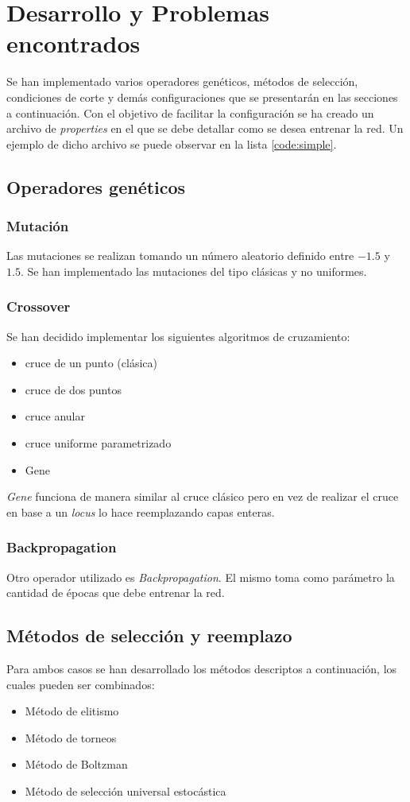 \documentclass{sig-alternate}
\begin{document}
\section{Desarrollo y Problemas encontrados}
Se han implementado varios operadores genéticos, métodos de selección, condiciones de corte y demás configuraciones que se presentarán en las secciones a continuación.
Con el objetivo de facilitar la configuración se ha creado un archivo de
\textit{properties} en el que se debe detallar como se desea entrenar la red.
Un ejemplo de dicho archivo se puede observar en la lista \ref{code:simple}.

	\subsection{Operadores genéticos}
	\subsubsection{Mutación}
	Las mutaciones se realizan tomando un número aleatorio definido entre $-1.5$ y $1.5$.
	Se han implementado las mutaciones del tipo clásicas y no uniformes.

	\subsubsection{Crossover}
	Se han decidido implementar los siguientes algoritmos de cruzamiento:
	\begin{itemize}
		\item cruce de un punto (clásica)
		\item cruce de dos puntos
		\item cruce anular
		\item cruce uniforme parametrizado
		\item Gene
	\end{itemize}

	\textit{Gene} funciona de manera similar al cruce clásico pero en vez de
	realizar el cruce en base a un \textit{locus} lo hace reemplazando
	capas enteras.

	\subsubsection{Backpropagation}
	Otro operador utilizado es \textit{Backpropagation}.
	El mismo toma como parámetro la cantidad de épocas que debe entrenar la red.

	\subsection{Métodos de selección y reemplazo}
	Para ambos casos se han desarrollado los métodos descriptos a
	continuación, los cuales pueden ser combinados:
	\begin{itemize}
		\item Método de elitismo
		\item Método de torneos
		 \item Método de Boltzman
		 \item Método de selección universal estocástica
	\end{itemize}
\end{document}
